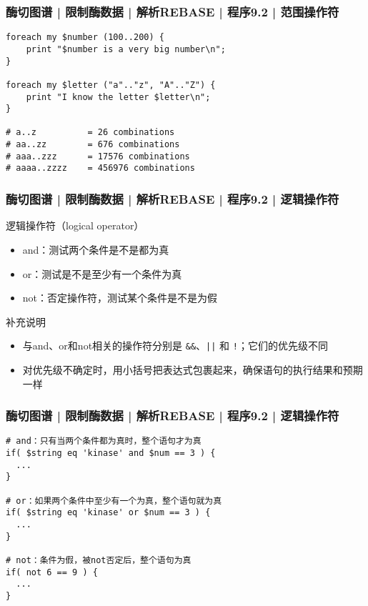 \begin{frame}[fragile]
  \frametitle{酶切图谱 | 限制酶数据 | 解析REBASE | 程序9.2 | \alert{范围操作符}}
\begin{lstlisting}
foreach my $number (100..200) {
    print "$number is a very big number\n";
}

foreach my $letter ("a".."z", "A".."Z") {
    print "I know the letter $letter\n";
}

# a..z          = 26 combinations
# aa..zz        = 676 combinations
# aaa..zzz      = 17576 combinations
# aaaa..zzzz    = 456976 combinations
\end{lstlisting}
\end{frame}

\begin{frame}[fragile]
  \frametitle{酶切图谱 | 限制酶数据 | 解析REBASE | 程序9.2 | \alert{逻辑操作符}}
  \begin{block}{逻辑操作符（logical operator）}
    \begin{itemize}
      \item and：测试两个条件是不是都为真
      \item or：测试是不是至少有一个条件为真
      \item not：否定操作符，测试某个条件是不是为假
    \end{itemize}
  \end{block}
  \pause
  \begin{block}{补充说明}
    \begin{itemize}
      \item 与and、or和not相关的操作符分别是 \verb|&&|、\verb=||= 和 \verb|!|；它们的优先级不同
      \item 对优先级不确定时，用小括号把表达式包裹起来，确保语句的执行结果和预期一样
    \end{itemize}
  \end{block}
\end{frame}

\begin{frame}[fragile]
  \frametitle{酶切图谱 | 限制酶数据 | 解析REBASE | 程序9.2 | \alert{逻辑操作符}}
\begin{lstlisting}
# and：只有当两个条件都为真时，整个语句才为真
if( $string eq 'kinase' and $num == 3 ) {
  ...
}

# or：如果两个条件中至少有一个为真，整个语句就为真
if( $string eq 'kinase' or $num == 3 ) {
  ...
}

# not：条件为假，被not否定后，整个语句为真
if( not 6 == 9 ) {
  ...
}
\end{lstlisting}
\end{frame}

